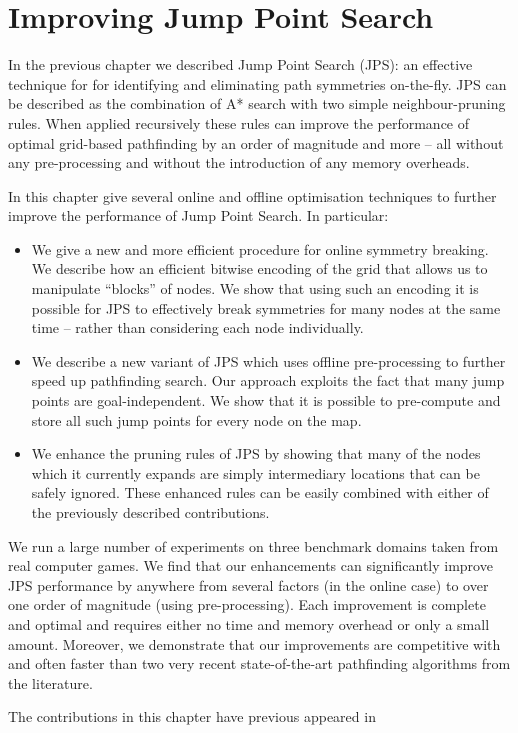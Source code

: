 \chapter{Improving Jump Point Search}
\label{cha::jps2}
In the previous chapter we described Jump Point Search (JPS): an effective
technique for for identifying and eliminating path symmetries on-the-fly.  JPS
can be described as the combination of A* search with two simple
neighbour-pruning rules. When applied recursively these rules can improve the
performance of optimal grid-based pathfinding by an order of magnitude and
more -- all without any pre-processing and without the introduction of any
memory overheads. 

In this chapter give several online and offline optimisation techniques to 
further improve the performance of Jump Point Search. In particular:
\begin{itemize}
\item We give a new and more efficient procedure for online symmetry breaking. 
We describe how an efficient bitwise encoding of the grid that
allows us to manipulate ``blocks'' of nodes.
We show that using such an encoding it is possible
for JPS to effectively break symmetries for many nodes at the same time -- 
rather than considering each node individually.
\item We describe a new variant of JPS which uses offline pre-processing to 
further speed up pathfinding search. Our approach exploits the fact that many
jump points are goal-independent. We show that it is possible to pre-compute 
and store all such jump points for every node on the map.
\item We enhance the pruning rules of JPS by showing that many of the nodes
which it currently expands are simply intermediary locations that can be
safely ignored. These enhanced rules can be easily combined with either
of the previously described contributions.
\end{itemize}

We run a large number of experiments on three benchmark domains taken from real
computer games. We find that our  enhancements can significantly improve JPS performance by
anywhere from several factors  (in the online case) to over one order of magnitude
(using pre-processing). Each improvement is complete and optimal
and requires either no time and memory overhead or only a small amount.
Moreover, we demonstrate that our improvements are competitive with and often 
faster than two very recent state-of-the-art pathfinding algorithms from the literature.

The contributions in this chapter have previous appeared in~
\citep{DBLP:conf/aips/HaraborG14}

